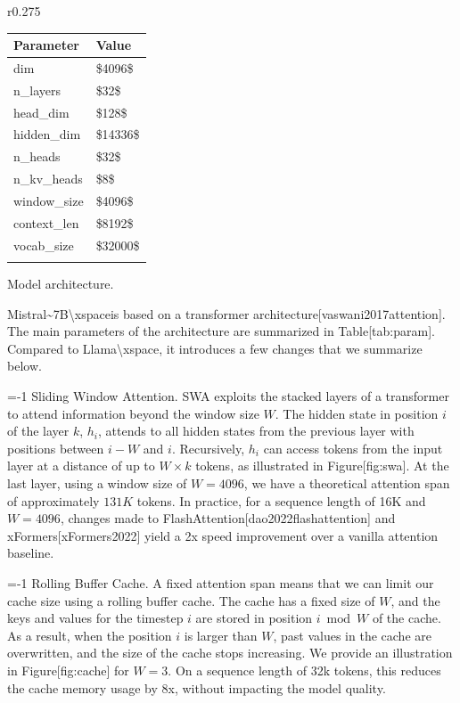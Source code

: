 \documentclass[11pt,a4paper]{article}
\begin{document}
r0.275

\begin{table}[h]
\begin{tabular}{|l|l|}
\hline
Parameter & Value \\ \hline
dim & \$4096\$ \\ \hline
n\_layers & \$32\$ \\ \hline
head\_dim & \$128\$ \\ \hline
hidden\_dim & \$14336\$ \\ \hline
n\_heads & \$32\$ \\ \hline
n\_kv\_heads & \$8\$ \\ \hline
window\_size & \$4096\$ \\ \hline
context\_len & \$8192\$ \\ \hline
vocab\_size & \$32000\$ \\ \hline
 &  \\ \hline
\end{tabular}
\end{table}

Model architecture.

Mistral\textasciitilde{}7B\textbackslash{}xspaceis based on a transformer architecture[vaswani2017attention]. The main parameters of the architecture are summarized in Table[tab:param]. Compared to Llama\textbackslash{}xspace, it introduces a few changes that we summarize below.

=-1 Sliding Window Attention. SWA exploits the stacked layers of a transformer to attend information beyond the window size $W$. The hidden state in position $i$ of the layer $k$, $h_i$, attends to all hidden states from the previous layer with positions between $i-W$ and $i$. Recursively, $h_i$ can access tokens from the input layer at a distance of up to $W \times k$ tokens, as illustrated in Figure[fig:swa]. At the last layer, using a window size of $W=4096$, we have a theoretical attention span of approximately $131K$ tokens. In practice, for a sequence length of 16K and $W=4096$, changes made to FlashAttention[dao2022flashattention] and xFormers[xFormers2022] yield a 2x speed improvement over a vanilla attention baseline.

=-1 Rolling Buffer Cache. A fixed attention span means that we can limit our cache size using a rolling buffer cache. The cache has a fixed size of $W$, and the keys and values for the timestep $i$ are stored in position $i \bmod W$ of the cache. As a result, when the position $i$ is larger than $W$, past values in the cache are overwritten, and the size of the cache stops increasing. We provide an illustration in Figure[fig:cache] for $W=3$. On a sequence length of 32k tokens, this reduces the cache memory usage by 8x, without impacting the model quality.
\end{document}
